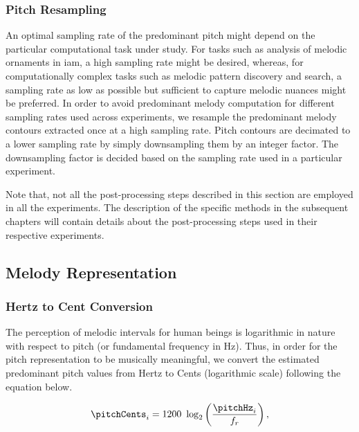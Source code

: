 {\subsubsection{Pitch Resampling}
\label{sec:data_processing_pitch_resampling}

An optimal sampling rate of the predominant pitch might depend on the particular computational task under study. For tasks such as analysis of melodic ornaments in \gls{iam}, a high sampling rate might be desired, whereas, for computationally complex tasks such as melodic pattern discovery and search, a sampling rate as low as possible but sufficient to capture melodic nuances might be preferred. In order to avoid predominant melody computation for different sampling rates used across experiments, we resample the predominant melody contours extracted once at a high sampling rate. Pitch contours are decimated to a lower sampling rate by simply downsampling them by an integer factor. The downsampling factor is decided based on the sampling rate used in a particular experiment.

Note that, not all the post-processing steps described in this section are employed in all the experiments. The description of the specific methods in the subsequent chapters will contain details about the post-processing steps used in their respective experiments.


\subsection{Melody Representation} 
\label{sec:pre_processing_melody_representation}

\subsubsection{Hertz to Cent Conversion}
\label{sec:data_processing_cent_conversion}

The perception of melodic intervals for human beings is logarithmic in nature with respect to pitch (or fundamental frequency in Hz). Thus, in order for the pitch representation to be musically meaningful, we convert the estimated predominant pitch values from Hertz to Cents (logarithmic scale) following the equation below.

\begin{equation}
\label{eq:hertz_to_cent_conversion}	
\pitchCents_i = 1200~\log_2\left(\frac{\pitchHz_i}{f_r}\right) ,
\end{equation}

}
